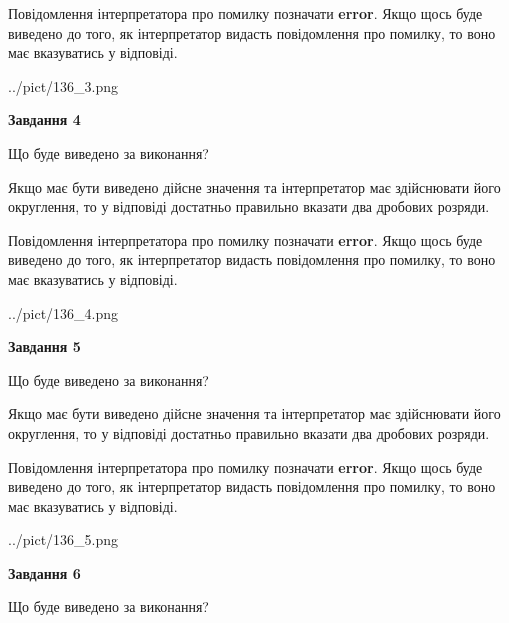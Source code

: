\documentclass[12pt, ukrainian]{article}
\begin{document}
{\begin {Large}
Повідомлення інтерпретатора про помилку позначати \textbf{error}.
Якщо щось буде виведено до того, як інтерпретатор видасть повідомлення про помилку, 
то воно має вказуватись у відповіді. \par

\begin{center}
	{../pict/136_3.png}
\end{center}
\newpage

{\begin {center}\textbf{Завдання 4}\end {center}}\par
Що буде виведено за виконання? \par

Якщо має бути виведено дійсне значення та інтерпретатор має здійснювати його округлення, 
то у відповіді достатньо правильно вказати два дробових розряди.

Повідомлення інтерпретатора про помилку позначати \textbf{error}.
Якщо щось буде виведено до того, як інтерпретатор видасть повідомлення про помилку, 
то воно має вказуватись у відповіді. \par

\begin{center}
	{../pict/136_4.png}
\end{center}
\newpage

{\begin {center}\textbf{Завдання 5}\end {center}}\par
Що буде виведено за виконання? \par

Якщо має бути виведено дійсне значення та інтерпретатор має здійснювати його округлення, 
то у відповіді достатньо правильно вказати два дробових розряди.

Повідомлення інтерпретатора про помилку позначати \textbf{error}.
Якщо щось буде виведено до того, як інтерпретатор видасть повідомлення про помилку, 
то воно має вказуватись у відповіді. \par

\begin{center}
	{../pict/136_5.png}
\end{center}
\newpage

{\begin {center}\textbf{Завдання 6}\end {center}}\par
Що буде виведено за виконання? \par


\end{Large}}
\end{document}
